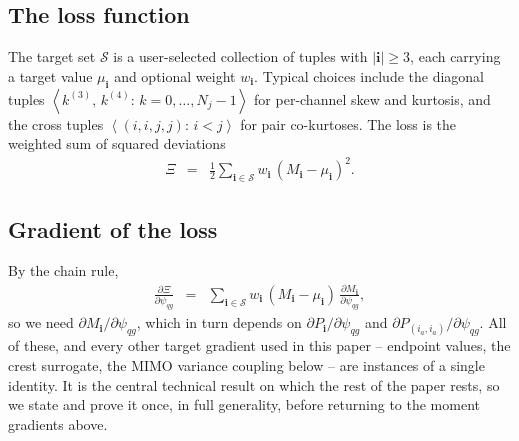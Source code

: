 \documentclass[10pt,a4paper]{article}
\numberwithin{equation}{section}
\newcommand{\seq}[1]{\left<#1\right>}
\newcommand{\mat}[1]{\left(#1\right)}
\begin{document}
\subsection*{The loss function}
The target set $\mathcal{S}$ is a user-selected collection of tuples with $|\mathbf{i}|\geq 3$, each carrying a target value $\mu_\mathbf{i}$ and optional weight $w_\mathbf{i}$. Typical choices include the diagonal tuples $\seq{k^{(3)},\,k^{(4)}:\,k=0,\ldots,N_j-1}$ for per-channel skew and kurtosis, and the cross tuples $\seq{(i,i,j,j):\,i<j}$ for pair co-kurtoses. The loss is the weighted sum of squared deviations
\begin{eqnarray}
\Xi &=& \frac{1}{2}\sum_{\mathbf{i}\in\mathcal{S}} w_\mathbf{i}\,\mat{M_\mathbf{i} - \mu_\mathbf{i}}^2.
\end{eqnarray}

\subsection*{Gradient of the loss}
By the chain rule,
\begin{eqnarray}
\frac{\partial \Xi}{\partial \psi_{q g}} &=& \sum_{\mathbf{i}\in\mathcal{S}} w_\mathbf{i}\,\mat{M_\mathbf{i} - \mu_\mathbf{i}}\,\frac{\partial M_\mathbf{i}}{\partial \psi_{q g}},
\end{eqnarray}
so we need $\partial M_\mathbf{i}/\partial \psi_{q g}$, which in turn depends on $\partial P_\mathbf{i}/\partial \psi_{q g}$ and $\partial P_{(i_a,i_a)}/\partial \psi_{q g}$. All of these, and every other target gradient used in this paper -- endpoint values, the crest surrogate, the MIMO variance coupling below -- are instances of a single identity. It is the central technical result on which the rest of the paper rests, so we state and prove it once, in full generality, before returning to the moment gradients above.
\end{document}
